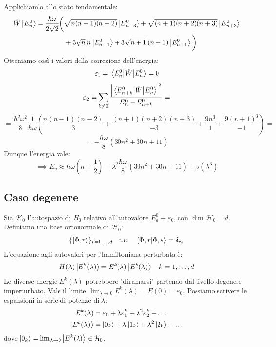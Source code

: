 Applichiamlo allo stato fondamentale:
\[
\begin{split}
    \hat{W}\ket{E_n^0} = \frac{\hbar \omega}{2\sqrt{2}} \bigg( &\sqrt{n(n-1)(n-2)} \ket{E_{n-3}^0} + \sqrt{(n+1)(n+2)(n+3)} \ket{E_{n+3}^0} \\
    &+ 3 \sqrt{n} \, n \ket{E_{n-1}^0} + 3 \sqrt{n+1} \, (n+1) \ket{E_{n+1}^0} \bigg)
\end{split}
\]
Otteniamo così i valori della correzione dell'energia:
\[
    \varepsilon_1 = \mel{E_n^0}{\hat{W}}{E_n^0} = 0 
\]
\[
    \varepsilon_2 = \sum_{k \neq 0} \frac{\abs{\mel{E_{n+k}^0}{\hat{W}}{E_n^0}}^2}{E_n^0 - E_{n+k}^0}=
\]
\[
    = \frac{\hbar^2 \omega^2}{8} \frac{1}{\hbar \omega} \left( \frac{n(n-1)(n-2)}{3} + \frac{(n+1)(n+2)(n+3)}{-3} + \frac{9n^3}{1} + \frac{9(n+1)^3}{-1} \right)=
\]
\[
    = -\frac{\hbar \omega}{8} ( 30 n^2 + 30 n + 11 )
\]
Dunque l'energia vale:
\begin{equation}
    \implies E_n \approx \hbar \omega \left(n + \frac{1}{2}\right) - \lambda^2 \frac{\hbar \omega}{8} ( 30 n^2 + 30 n + 11 ) + o(\lambda^3)
\end{equation}

\subsection{Caso degenere}
Sia $\mathcal{H}_0$ l'autospazio di $H_0$ relativo all'autovalore $E_a^0 \equiv \varepsilon_0$, con $\dim \mathcal{H}_0 = d$.
Definiamo una base ortonormale di $\mathcal{H}_0$:
\begin{equation}
    \{ \ket{\Phi, r} \}_{r=1,\dots,d} \quad \text{t.c.} \quad \braket{\Phi,r}{\Phi,s} = \delta_{rs}
\end{equation}
L'equazione agli autovalori per l'hamiltoniana perturbata è:
\begin{equation}
    H(\lambda)\ket{E^k(\lambda)} = E^k(\lambda)\ket{E^k(\lambda)} \quad k=1,\dots,d
\end{equation}
Le diverse energie $E^k(\lambda)$ potrebbero "diramarsi" partendo dal livello degenere imperturbato.
Vale il limite $\lim_{\lambda \to 0} E^k(\lambda) = E(0) = \varepsilon_0$.
Possiamo scrivere le espansioni in serie di potenze di $\lambda$:
\[
\begin{aligned}
    E^k(\lambda) &= \varepsilon_0 + \lambda \varepsilon_1^k + \lambda^2 \varepsilon_2^k + \dots \\
    \ket{E^k(\lambda)} &= \ket{0_k} + \lambda \ket{1_k} + \lambda^2 \ket{2_k} + \dots
\end{aligned}
\]
dove $\ket{0_k} = \lim_{\lambda \to 0} \ket{E^k(\lambda)} \in \mathcal{H}_0$.

